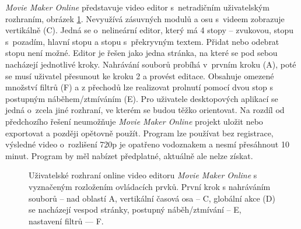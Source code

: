 \textit{Movie Maker Online} představuje video editor s~netradičním uživatelským rozhraním, obrázek \ref{img:moviemakeronline}. Nevyužívá zásuvných modulů a osu s~videem zobrazuje vertikálně (C). Jedná se o~nelineární editor, který má 4 stopy -- zvukovou, stopu s~pozadím, hlavní stopu a stopu s~překryvným textem. Přidat nebo odebrat stopu není možné. Editor je řešen jako jedna stránka, na které se pod sebou nacházejí jednotlivé kroky. Nahrávání souborů probíhá v~prvním kroku (A), poté se musí uživatel přesunout ke kroku 2 a provést editace. Obsahuje omezené množství filtrů (F) a z přechodů lze realizovat prolnutí pomocí dvou stop s postupným náběhem/ztmíváním (E). Pro uživatele desktopových aplikací se jedná o~zcela jiné rozhraní, ve kterém se budou těžko orientovat. Na rozdíl od předchozího řešení neumožňuje \textit{Movie Maker Online} projekt uložit nebo exportovat a později opětovně použít. Program lze používat bez registrace, výsledné video o~rozlišení 720p je opatřeno vodoznakem a nesmí přesáhnout 10 minut. Program by měl nabízet předplatné, aktuálně ale nelze získat.
\begin{figure}[h]
	\centering
	\caption{Uživatelské rozhraní online video editoru \textit{Movie Maker Online} s vyznačeným rozložením ovládacích prvků. První krok s nahráváním souborů -- nad oblastí A, vertikální časová osa -- C, globální akce (D) se nacházejí vespod stránky, postupný náběh/ztmívání -- E, nastavení filtrů --- F.}\label{img:moviemakeronline}
\end{figure}

